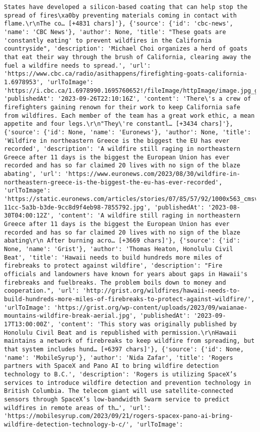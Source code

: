 \documentclass[
  letterpaper,
  DIV=11,
  numbers=noendperiod]{scrartcl}
\begin{document}
\begin{verbatim}
States have developed a silicon-based coating that can help stop the spread of fires\xa0by preventing materials coming in contact with flame.\r\nThe co… [+4831 chars]'}, {'source': {'id': 'cbc-news', 'name': 'CBC News'}, 'author': None, 'title': "These goats are 'constantly eating' to prevent wildfires in the California countryside", 'description': 'Michael Choi organizes a herd of goats that eat their way through the brush of California, clearing away the fuel a wildfire needs to spread.', 'url': 'https://www.cbc.ca/radio/asithappens/firefighting-goats-california-1.6978953', 'urlToImage': 'https://i.cbc.ca/1.6978990.1695760652!/fileImage/httpImage/image.jpg_gen/derivatives/16x9_620/goats.jpg', 'publishedAt': '2023-09-26T22:10:16Z', 'content': 'There\'s a crew of firefighters gaining renown for their work to keep California safe from wildfires. Each member of the team has a great work ethic, a mean appetite and four legs.\r\n"They\'re constantl… [+3434 chars]'}, {'source': {'id': None, 'name': 'Euronews'}, 'author': None, 'title': 'Wildfire in northeastern Greece is the biggest the EU has ever recorded', 'description': 'A wildfire still raging in northeastern Greece after 11 days is the biggest the European Union has ever recorded and has so far claimed 20 lives with no sign of the blaze abating', 'url': 'https://www.euronews.com/2023/08/30/wildfire-in-northeastern-greece-is-the-biggest-the-eu-has-ever-recorded', 'urlToImage': 'https://static.euronews.com/articles/stories/07/85/57/92/1000x563_cmsv2_6d582845-11cc-5a3b-b3de-9cc8d9f4eb98-7855792.jpg', 'publishedAt': '2023-08-30T04:00:12Z', 'content': 'A wildfire still raging in northeastern Greece after 11 days is the biggest the European Union has ever recorded and has so far claimed 20 lives with no sign of the blaze abating\r\n After burning acro… [+3669 chars]'}, {'source': {'id': None, 'name': 'Grist'}, 'author': 'Thomas Heaton, Honolulu Civil Beat', 'title': 'Hawaii needs to build hundreds more miles of firebreaks to protect against wildfire', 'description': "Fire officials and landowners have known for years about gaps in Hawaii's firebreaks and fuelbreaks. The problem boils down to money and cooperation.", 'url': 'http://grist.org/wildfires/hawaii-needs-to-build-hundreds-more-miles-of-firebreaks-to-protect-against-wildfire/', 'urlToImage': 'https://grist.org/wp-content/uploads/2023/09/waianae-mountains-wildfire-break-aerial.jpg', 'publishedAt': '2023-09-17T13:00:00Z', 'content': 'This story was originally published by Honolulu Civil Beat and is republished with permission.\r\nHawaii maintains a network of firebreaks to keep wildfire from spreading, but that system includes hund… [+6397 chars]'}, {'source': {'id': None, 'name': 'MobileSyrup'}, 'author': 'Nida Zafar', 'title': 'Rogers partners with SpaceX and Pano AI to bring wildfire detection technology to B.C.', 'description': 'Rogers is utilizing SpaceX’s services to introduce wildfire detection and prevention technology in British Columbia. The telecom giant will use satellite-connected sensors through SpaceX’s low-bandwidth Swarm service to predict wildfires in remote areas of th…', 'url': 'https://mobilesyrup.com/2023/09/21/rogers-spacex-pano-ai-bring-wildfire-detection-technology-b-c/', 'urlToImage': 
\end{verbatim}
\end{document}
